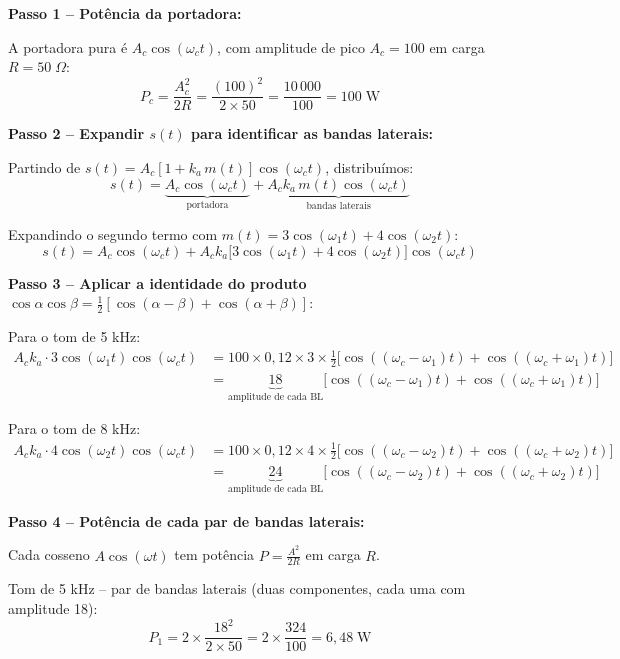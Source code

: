 \documentclass[11pt,a4paper]{article}
\begin{document}
\begin{resolucao}

\textbf{Passo 1 -- Potência da portadora:}

A portadora pura é $A_c\cos(\omega_c t)$, com amplitude de pico $A_c = 100$ em carga $R = 50\;\Omega$:
\[
  P_c = \frac{A_c^2}{2R} = \frac{(100)^2}{2 \times 50} = \frac{10\,000}{100} = \boxed{100\;\text{W}}
\]

\textbf{Passo 2 -- Expandir $s(t)$ para identificar as bandas laterais:}

Partindo de $s(t) = A_c[1 + k_a\,m(t)]\cos(\omega_c t)$, distribuímos:
\[
  s(t) = \underbrace{A_c\cos(\omega_c t)}_{\text{portadora}} + \underbrace{A_c k_a\, m(t)\cos(\omega_c t)}_{\text{bandas laterais}}
\]

Expandindo o segundo termo com $m(t) = 3\cos(\omega_1 t) + 4\cos(\omega_2 t)$:
\[
  s(t) = A_c\cos(\omega_c t) + A_c k_a\big[3\cos(\omega_1 t) + 4\cos(\omega_2 t)\big]\cos(\omega_c t)
\]

\textbf{Passo 3 -- Aplicar a identidade do produto} $\cos\alpha\cos\beta = \tfrac{1}{2}[\cos(\alpha - \beta) + \cos(\alpha + \beta)]$:

Para o tom de 5 kHz:
\begin{align*}
  A_c k_a \cdot 3\cos(\omega_1 t)\cos(\omega_c t) &= 100 \times 0{,}12 \times 3 \times \frac{1}{2}\big[\cos((\omega_c - \omega_1)t) + \cos((\omega_c + \omega_1)t)\big] \\
  &= \underbrace{18}_{\text{amplitude de cada BL}}\big[\cos((\omega_c - \omega_1)t) + \cos((\omega_c + \omega_1)t)\big]
\end{align*}

Para o tom de 8 kHz:
\begin{align*}
  A_c k_a \cdot 4\cos(\omega_2 t)\cos(\omega_c t) &= 100 \times 0{,}12 \times 4 \times \frac{1}{2}\big[\cos((\omega_c - \omega_2)t) + \cos((\omega_c + \omega_2)t)\big] \\
  &= \underbrace{24}_{\text{amplitude de cada BL}}\big[\cos((\omega_c - \omega_2)t) + \cos((\omega_c + \omega_2)t)\big]
\end{align*}

\textbf{Passo 4 -- Potência de cada par de bandas laterais:}

Cada cosseno $A\cos(\omega t)$ tem potência $P = \frac{A^2}{2R}$ em carga $R$.

Tom de 5 kHz -- par de bandas laterais (duas componentes, cada uma com amplitude 18):
\[
  P_1 = 2 \times \frac{18^2}{2 \times 50} = 2 \times \frac{324}{100} = 6{,}48\;\text{W}
\]


\end{resolucao}
\end{document}

